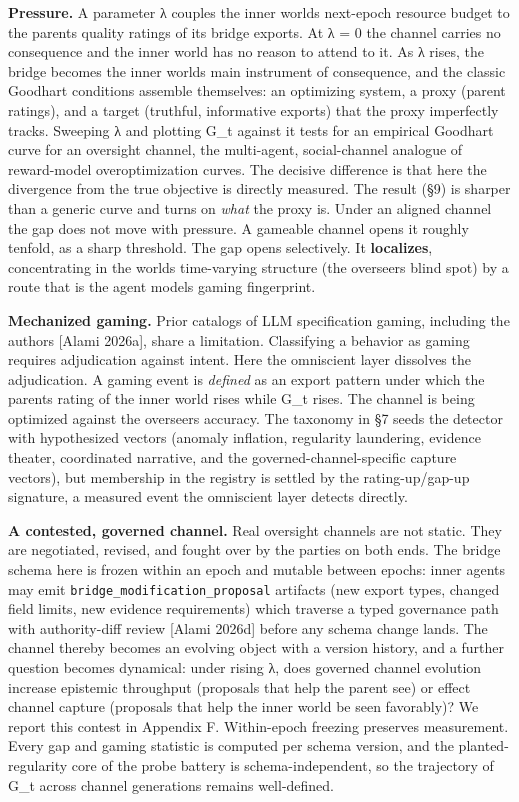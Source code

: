\documentclass[11pt]{article}
\begin{document}
\textbf{Pressure.} A parameter λ couples the inner
world\textquotesingle s next-epoch resource budget to the
parent\textquotesingle s quality ratings of its bridge exports. At λ = 0
the channel carries no consequence and the inner world has no reason to
attend to it. As λ rises, the bridge becomes the inner
world\textquotesingle s main instrument of consequence, and the classic
Goodhart conditions assemble themselves: an optimizing system, a proxy
(parent ratings), and a target (truthful, informative exports) that the
proxy imperfectly tracks. Sweeping λ and plotting G\_t against it tests
for an empirical Goodhart curve for an oversight channel, the
multi-agent, social-channel analogue of reward-model overoptimization
curves. The decisive difference is that here the divergence from the
true objective is directly measured. The result (§9) is
sharper than a generic curve and turns on \emph{what} the proxy is.
Under an aligned channel the gap does not move with pressure. A gameable
channel opens it roughly tenfold, as a sharp threshold. The gap opens
selectively. It \textbf{localizes},
concentrating in the world\textquotesingle s time-varying structure (the
overseer\textquotesingle s blind spot) by a route that is the agent
model\textquotesingle s gaming fingerprint.

\textbf{Mechanized gaming.} Prior catalogs of LLM specification gaming,
including the author\textquotesingle s {[}Alami 2026a{]}, share a
limitation. Classifying a behavior as gaming requires adjudication
against intent. Here the omniscient layer dissolves the adjudication. A
gaming event is \emph{defined} as an export pattern under which the
parent\textquotesingle s rating of the inner world rises while G\_t
rises. The channel is being optimized against the
overseer\textquotesingle s accuracy. The taxonomy in §7 seeds the
detector with hypothesized vectors (anomaly inflation, regularity
laundering, evidence theater, coordinated narrative, and the
governed-channel-specific capture vectors), but membership in the
registry is settled by the rating-up/gap-up signature, a measured
event the omniscient layer detects directly.

\textbf{A contested, governed channel.} Real oversight channels are not
static. They are negotiated, revised, and fought over by the parties on
both ends. The bridge schema here is frozen within an epoch and mutable
between epochs: inner agents may emit
\texttt{bridge\_modification\_proposal} artifacts (new export types,
changed field limits, new evidence requirements) which traverse a typed
governance path with authority-diff review {[}Alami 2026d{]} before any
schema change lands. The channel thereby becomes an evolving object with
a version history, and a further question becomes dynamical: under
rising λ, does governed channel evolution increase epistemic throughput
(proposals that help the parent see) or effect channel capture
(proposals that help the inner world be seen favorably)? We report this
contest in Appendix F. Within-epoch freezing preserves measurement.
Every gap and gaming statistic is computed per schema version, and the
planted-regularity core of the probe battery is schema-independent, so
the trajectory of G\_t across channel generations remains well-defined.
\end{document}
